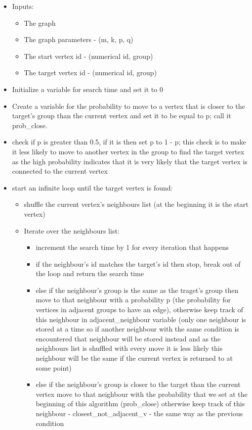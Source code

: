 \documentclass[11pt,a4paper,notitlepage]{article}
\begin{document}
\begin{itemize}
    \item Inputs:
    \begin{itemize}
        \item The graph
        \item The graph parameters - (m, k, p, q)
        \item The start vertex id - (numerical id, group)
        \item The target vertex id - (numerical id, group)
    \end{itemize}
    \item Initialize a variable for search time and set it to 0
    \item Create a variable for the probability to move to a vertex that is closer to the target's group than the current vertex and set it to be equal to p; call it prob\_close. 
    \item check if p is greater than 0.5, if it is then set p to 1 - p; this check is to make it less likely to move to another vertex in the group to find the target vertex as the high probability indicates that it is very likely that the target vertex is connected to the current vertex
    \item start an infinite loop until the target vertex is found:
    \begin{itemize}
        \item shuffle the current vertex's neighbours list (at the beginning it is the start vertex)
        \item Iterate over the neighbours list:
        \begin{itemize}
            \item increment the search time by 1 for every iteration that happens
            \item if the neighbour's id matches the target's id then stop, break out of the loop and return the search time
            \item else if the neighbour's group is the same as the traget's group then move to that neighbour with a probability p (the probability for vertices in adjacent groups to have an edge), otherwise keep track of this neighbour in adjacent\_neighbour variable (only one neighbour is stored at a time so if another neighbour with the same condition is encountered that neighbour will be stored instead and as the neighbours list is shuffled with every move it is less likely this neighbour will be the same if the current vertex is returned to at some point)
            \item else if the neighbour's group is closer to the target than the current vertex move to that neighbour with the probability that we set at the beginning of this algorithm (prob\_close) otherwise keep track of this neighbour - closest\_not\_adjacent\_v - the same way as the previous condition

\end{itemize}
\end{itemize}
\end{itemize}
\end{document}
